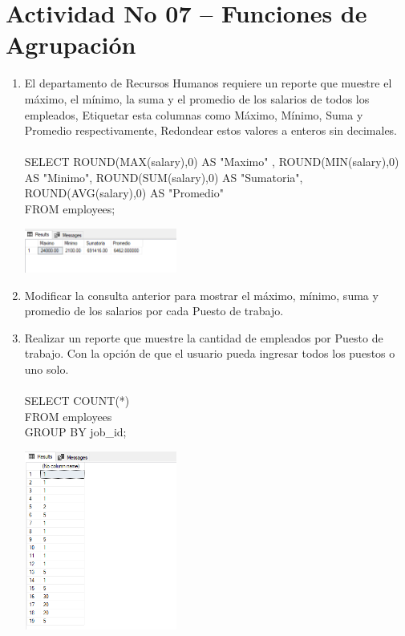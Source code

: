 \section{Actividad No 07 – Funciones de Agrupaci\'on} 
		
\begin{enumerate}[1.]
	\item El departamento de Recursos Humanos requiere un reporte que muestre el máximo, el mínimo, la suma y el promedio de los salarios de todos los empleados, Etiquetar esta columnas como Máximo, Mínimo, Suma y Promedio respectivamente, Redondear estos valores a enteros sin decimales.
	\\
	\\SELECT ROUND(MAX(salary),0) AS "Maximo" , ROUND(MIN(salary),0) AS "Minimo", ROUND(SUM(salary),0) AS "Sumatoria", ROUND(AVG(salary),0) AS "Promedio"
	\\FROM employees;
    	\begin{center}
	\includegraphics[width=5cm]{./Imagenes/Imagen01_Act07} 
	\end{center}
	\item Modificar la consulta anterior para mostrar el máximo, mínimo, suma y promedio de los salarios por cada Puesto de trabajo. 
	\item Realizar un reporte que muestre la cantidad de empleados por Puesto de trabajo. Con la opción de que el usuario pueda ingresar todos los puestos o uno solo.
	\\	
	\\SELECT COUNT(*)	
	\\FROM employees
	\\GROUP BY job\_id;
	\begin{center}
	\includegraphics[width=5cm]{./Imagenes/Imagen02_Act07} 

\end{center}
\end{enumerate}
